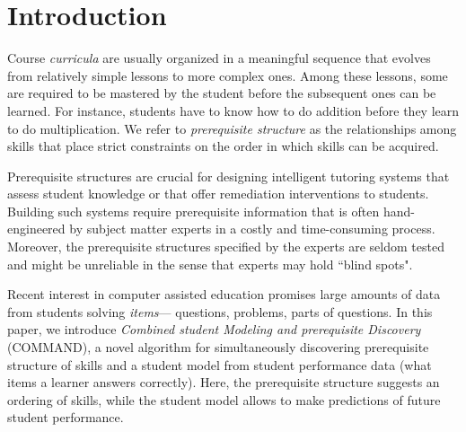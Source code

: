\documentclass{edm_template}
\begin{document}
\section{Introduction}
\label{sec:introduction}
Course \textit{curricula} are usually organized in a meaningful sequence  that evolves from relatively simple lessons to more complex ones. 
Among these lessons, some are required to be mastered by the student  before the subsequent ones can be learned.
For instance, students have to know how to do addition before they learn to do multiplication.
We refer to \textit{prerequisite structure} as the relationships among skills that place strict constraints on the order in which  skills can be acquired. 

Prerequisite structures are crucial for designing intelligent tutoring systems that assess student knowledge or that offer remediation interventions to students.
Building such systems require prerequisite information that is often hand-engineered by subject matter experts in a costly and time-consuming process. 
Moreover, the prerequisite structures specified by the experts are seldom tested and might be unreliable in the sense that experts may hold ``blind spots".


Recent interest in computer assisted education promises large amounts of data from students solving \textit{items}--- questions, problems, parts of questions.
In this paper, we introduce \emph{Combined student Modeling and prerequisite Discovery} (COMMAND), 
a novel algorithm for simultaneously discovering prerequisite structure of skills and a student model from student performance data
(what items a learner answers correctly).
Here,  the prerequisite structure suggests an ordering of skills, while the student model allows to make predictions of future student performance.
\end{document}
